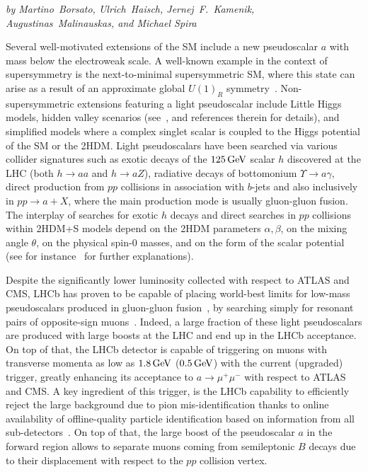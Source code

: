 \begin{center}
{\it by Martino~Borsato, Ulrich~Haisch, Jernej~F.~Kamenik, Augustinas~Malinauskas, and Michael Spira}
\end{center}

Several well-motivated extensions of the SM include a new pseudoscalar $a$ with mass below the electroweak scale. A well-known example in the context of supersymmetry is the next-to-minimal supersymmetric SM, where this state can arise as a result of an approximate global $U(1)_R$ symmetry~\cite{Dobrescu:2000yn}. Non-supersymmetric extensions featuring a light pseudoscalar include Little Higgs models, hidden valley scenarios (see~\cite{Curtin:2013fra}, and references therein for details), and simplified models where a complex singlet scalar is coupled to the Higgs potential of the SM or the 2HDM. Light pseudoscalars have been searched via various collider signatures such as exotic decays of the $125 \, {\rm GeV}$ scalar $h$ discovered at the LHC (both $h\to aa$ and $h\to aZ$), radiative decays of bottomonium $\Upsilon\to a\gamma$, direct production from $pp$ collisions in association with $b$-jets and also inclusively in $pp\to a+X$, where the main production mode is usually gluon-gluon fusion. The interplay of searches for exotic $h$ decays and direct searches in $pp$ collisions within 2HDM+S models depend on the 2HDM parameters $\alpha, \beta$, on the mixing angle $\theta$, on the physical spin-0 masses, and on the form of the scalar potential (see for instance~\cite{Haisch:2018kqx} for further explanations).

Despite the significantly lower luminosity collected with respect to ATLAS and CMS, LHCb has proven to be capable of placing world-best limits for low-mass pseudoscalars produced in gluon-gluon fusion~\cite{Haisch:2016hzu,Haisch:2018kqx}, by searching simply for resonant pairs of opposite-sign muons~\cite{Aaij:2017rft, Aaij:2018xpt}. Indeed, a large fraction of these light pseudoscalars are produced with large boosts at the LHC and end up in the LHCb acceptance. On top of that, the LHCb detector is capable of triggering on muons with transverse momenta as low as $1.8 \, {\rm GeV}$ ($0.5 \, {\rm GeV}$) with the current (upgraded) trigger, greatly enhancing its acceptance to $a\to\mu^+\mu^-$ with respect to ATLAS and CMS. A key ingredient of this trigger, is the LHCb capability to efficiently reject  the large background due to pion mis-identification thanks to online availability of offline-quality particle identification based on information from all sub-detectors~\cite{Aaij:2016rxn, Dujany:2015lxd}. On top of that, the large boost of the pseudoscalar $a$  in the forward region allows to separate muons coming from semileptonic $B$ decays due to their displacement with respect to the $pp$ collision vertex. 

